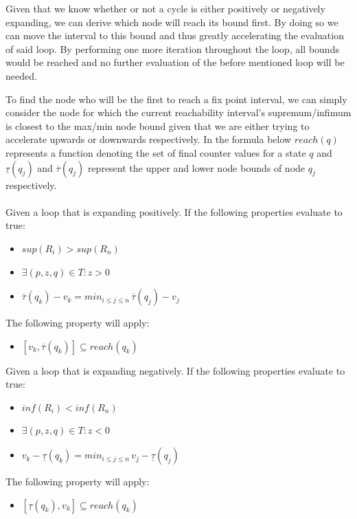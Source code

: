 \documentclass[12pt]{article}
\begin{document}
Given that we know whether or not a cycle is either positively or negatively expanding, we can derive which node will reach its bound first. By doing so we can move the interval to this bound and thus greatly accelerating the evaluation of said loop. By performing one more iteration throughout the loop, all bounds would be reached and no further evaluation of the before mentioned loop will be needed.

To find the node who will be the first to reach a fix point interval, we can simply consider the node for which the current reachability interval's supremum/infimum is closest to the max/min node bound given that we are either trying to accelerate upwards or downwards respectively. In the formula below $reach(q)$ represents a function denoting the set of final counter values for a state $q$ and $\underline{\tau}(q_j)$ and $\overline{\tau}(q_j)$ represent the upper and lower node bounds of node $q_j$ respectively.\\
\\
\noindent
Given a loop that is expanding positively. If the following properties evaluate to true:

\begin{itemize}
	\item $sup(R_i) > sup(R_n)$
	\item $\exists (p, z, q) \in T: z > 0$
	\item $\overline{\tau}(q_k) - v_k = min_{i\leq j \le n}\,\overline{\tau}(q_j) - v_j$
\end{itemize}
The following property will apply:
\begin{itemize}
	\item $[v_k, \overline{\tau}(q_k)] \subseteq reach(q_k)$
\end{itemize}


\noindent
Given a loop that is expanding negatively. If the following properties evaluate to true:

\begin{itemize}
	\item $inf(R_i) < inf(R_n)$
	\item $\exists (p, z, q) \in T: z < 0$
	\item $v_k - \underline{\tau}(q_k) = min_{i\leq j \le n}\,v_j - \underline{\tau}(q_j)$
\end{itemize}
The following property will apply:
\begin{itemize}
	\item $[\underline{\tau}(q_k), v_k] \subseteq reach(q_k)$
\end{itemize}
\end{document}
